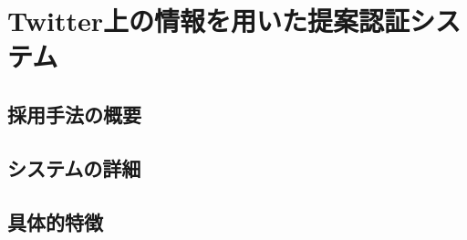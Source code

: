 \chapter{Twitter上の情報を用いた提案認証システム}\label{chap:system}

\section{採用手法の概要}
\section{システムの詳細}
\section{具体的特徴}


\newpage

